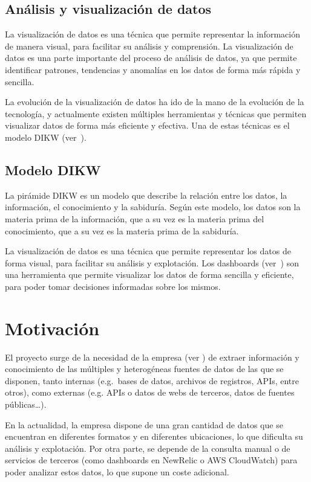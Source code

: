 \newpage{}
\subsection{Análisis y visualización de datos}\label{subsec:datos}
La visualización de datos es una técnica que permite representar la información de manera visual,
para facilitar su análisis y comprensión. La visualización de datos es una parte importante del
proceso de análisis de datos, ya que permite identificar patrones, tendencias y anomalías en los
datos de forma más rápida y sencilla.

La evolución de la visualización de datos ha ido de la mano de la evolución de la tecnología, y
actualmente existen múltiples herramientas y técnicas que permiten visualizar datos de forma
más eficiente y efectiva. Una de estas técnicas es el modelo DIKW (ver~).

\subsection{Modelo DIKW}\label{subsec:dikw}
La pirámide DIKW\cite{enwiki:1211227190} es un modelo que describe la relación entre los datos,
la información, el conocimiento y la sabiduría. Según este modelo, los datos son la materia prima
de la información, que a su vez es la materia prima del conocimiento, que a su vez es la materia
prima de la sabiduría.

La visualización de datos es una técnica que permite representar los datos de forma visual, para
facilitar su análisis y explotación. Los dashboards (ver~) son una
herramienta que permite visualizar los datos de forma sencilla y eficiente, para poder tomar
decisiones informadas sobre los mismos.

\newpage{}

\section{Motivación}\label{sec:motivacion}
El proyecto surge de la necesidad de la empresa (ver ) de extraer información
y conocimiento de las múltiples y heterogéneas fuentes de datos de las que se disponen,
tanto internas (e.g.~bases de datos, archivos de registros, APIs, entre otros),
como externas (e.g. APIs o datos de webs de terceros, datos de fuentes públicas\ldots).

En la actualidad, la empresa dispone de una gran cantidad de datos que se encuentran en
diferentes formatos y en diferentes ubicaciones, lo que dificulta su análisis y explotación.
Por otra parte, se depende de la consulta manual o de servicios de terceros (como dashboards
en NewRelic o AWS CloudWatch) para poder analizar estos datos, lo que supone un coste adicional.

